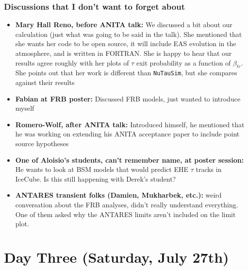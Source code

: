 \subsubsection{Discussions that I don't want to forget about}
\begin{itemize}
    \item \textbf{Mary Hall Reno, before ANITA talk:} We discussed a bit about our calculation (just what was going to be said in the talk). She mentioned that she wants her code to be open source, it will include EAS evolution in the atmosphere, and is written in FORTRAN. She is happy to hear that our results agree roughly with her plots of $\tau$ exit probability as a function of $\beta_{tr}$. She points out that her work is different than \texttt{NuTauSim}, but she compares against their results
    \item \textbf{Fabian at FRB poster:} Discussed FRB models, just wanted to introduce myself
    \item \textbf{Romero-Wolf, after ANITA talk:} Introduced himself, he mentioned that he was working on extending his ANITA acceptance paper to include point source hypotheses
    \item \textbf{One of Aloisio's students, can't remember name, at poster session:} He wants to look at BSM models that would predict EHE $\tau$ tracks in IceCube. Is this still happening with Derek's student?
    \item \textbf{ANTARES transient folks (Damien, Mukharbek, etc.):} weird conversation about the FRB analyses, didn't really understand everything. One of them asked why the ANTARES limits aren't included on the limit plot.
\end{itemize}


\section{Day Three (Saturday, July 27th)}
